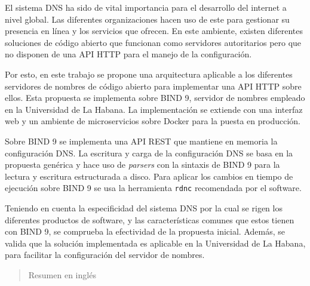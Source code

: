 \begin{resumen}
El sistema DNS ha sido de vital importancia para el desarrollo del internet a nivel global. Las diferentes organizaciones hacen uso de este para gestionar su presencia en línea y los servicios que ofrecen. En este ambiente, existen diferentes soluciones de código abierto que funcionan como servidores autoritarios pero que no disponen de una API HTTP para el manejo de la configuración.

Por esto, en este trabajo se propone una arquitectura aplicable a los diferentes servidores de nombres de código abierto para implementar una API HTTP sobre ellos. Esta propuesta se implementa sobre BIND 9, servidor de nombres empleado en la Universidad de La Habana. La implementación se extiende con una interfaz web y un ambiente de microservicios sobre Docker para la puesta en producción.

Sobre BIND 9 se implementa una API REST que mantiene en memoria la configuración DNS. La escritura y carga de la configuración DNS se basa en la propuesta genérica y hace uso de \textit{parsers} con la sintaxis de BIND 9 para la lectura y escritura estructurada a disco. Para aplicar los cambios en tiempo de ejecución sobre BIND 9 se usa la herramienta \verb|rdnc| recomendada por el software.

Teniendo en cuenta la especificidad del sistema DNS por la cual se rigen los diferentes productos de software, y las características comunes que estos tienen con BIND 9, se comprueba la efectividad de la propuesta inicial. Además, se valida que la solución implementada es aplicable en la Universidad de La Habana, para facilitar la configuración del servidor de nombres.
\end{resumen}

\begin{abstract}
	Resumen en inglés
\end{abstract}